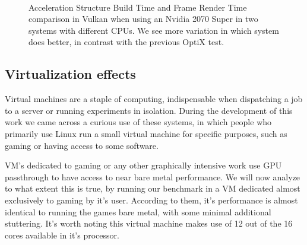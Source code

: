 \begin{figure}
    \\
    \caption{Acceleration Structure Build Time and Frame Render Time comparison in Vulkan when using an Nvidia 2070 Super in two systems with different CPUs. We see more variation in which system does better, in contrast with the previous OptiX test.}
    \label{vulkan-2070-super-comparison}
\end{figure}


\clearpage
\subsection{Virtualization effects}
Virtual machines are a staple of computing, indispensable when dispatching a job to a server or running experiments in isolation. During the development of this work we came across a curious use of these systems, in which people who primarily use Linux run a small virtual machine for specific purposes, such as gaming or having access to some software. 

VM's dedicated to gaming or any other graphically intensive work use GPU passthrough to have access to near bare metal performance. We will now analyze to what extent this is true, by running our benchmark in a VM dedicated almost exclusively to gaming by it's user. According to them, it's performance is almost identical to running the games bare metal, with some minimal additional stuttering. It's worth noting this virtual machine makes use of 12 out of the 16 cores available in it's processor.

